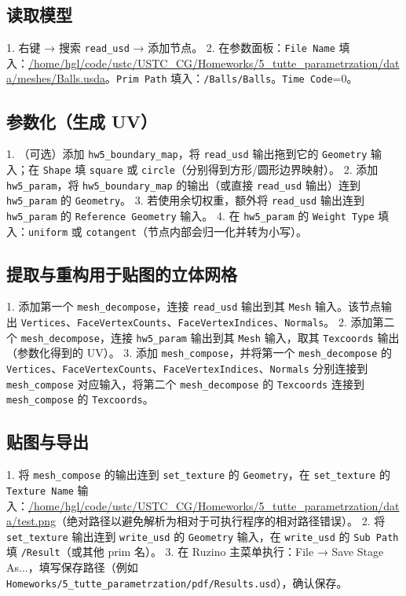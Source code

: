 \documentclass[11pt,a4paper]{article}
\begin{document}
\subsection{读取模型}
1. 右键 → 搜索 \verb|read_usd| → 添加节点。
2. 在参数面板：\verb|File Name| 填入：\url{/home/hgl/code/ustc/USTC_CG/Homeworks/5_tutte_parametrzation/data/meshes/Balls.usda}。\verb|Prim Path| 填入：\verb|/Balls/Balls|。\verb|Time Code|=0。

\subsection{参数化（生成 UV）}
1. （可选）添加 \verb|hw5_boundary_map|，将 \verb|read_usd| 输出拖到它的 \verb|Geometry| 输入；在 \verb|Shape| 填 \verb|square| 或 \verb|circle|（分别得到方形/圆形边界映射）。
2. 添加 \verb|hw5_param|，将 \verb|hw5_boundary_map| 的输出（或直接 \verb|read_usd| 输出）连到 \verb|hw5_param| 的 \verb|Geometry|。
3. 若使用余切权重，额外将 \verb|read_usd| 输出连到 \verb|hw5_param| 的 \verb|Reference Geometry| 输入。
4. 在 \verb|hw5_param| 的 \verb|Weight Type| 填入：\verb|uniform| 或 \verb|cotangent|（节点内部会归一化并转为小写）。

\subsection{提取与重构用于贴图的立体网格}
1. 添加第一个 \verb|mesh_decompose|，连接 \verb|read_usd| 输出到其 \verb|Mesh| 输入。该节点输出 \verb|Vertices|、\verb|FaceVertexCounts|、\verb|FaceVertexIndices|、\verb|Normals|。
2. 添加第二个 \verb|mesh_decompose|，连接 \verb|hw5_param| 输出到其 \verb|Mesh| 输入，取其 \verb|Texcoords| 输出（参数化得到的 UV）。
3. 添加 \verb|mesh_compose|，并将第一个 \verb|mesh_decompose| 的 \verb|Vertices|、\verb|FaceVertexCounts|、\verb|FaceVertexIndices|、\verb|Normals| 分别连接到 \verb|mesh_compose| 对应输入，将第二个 \verb|mesh_decompose| 的 \verb|Texcoords| 连接到 \verb|mesh_compose| 的 \verb|Texcoords|。

\subsection{贴图与导出}
1. 将 \verb|mesh_compose| 的输出连到 \verb|set_texture| 的 \verb|Geometry|，在 \verb|set_texture| 的 \verb|Texture Name| 输入：\url{/home/hgl/code/ustc/USTC_CG/Homeworks/5_tutte_parametrzation/data/test.png}（绝对路径以避免解析为相对于可执行程序的相对路径错误）。
2. 将 \verb|set_texture| 输出连到 \verb|write_usd| 的 \verb|Geometry| 输入，在 \verb|write_usd| 的 \verb|Sub Path| 填 \verb|/Result|（或其他 prim 名）。
3. 在 Ruzino 主菜单执行：File → Save Stage As...，填写保存路径（例如 \verb|Homeworks/5_tutte_parametrzation/pdf/Results.usd|），确认保存。
\end{document}
